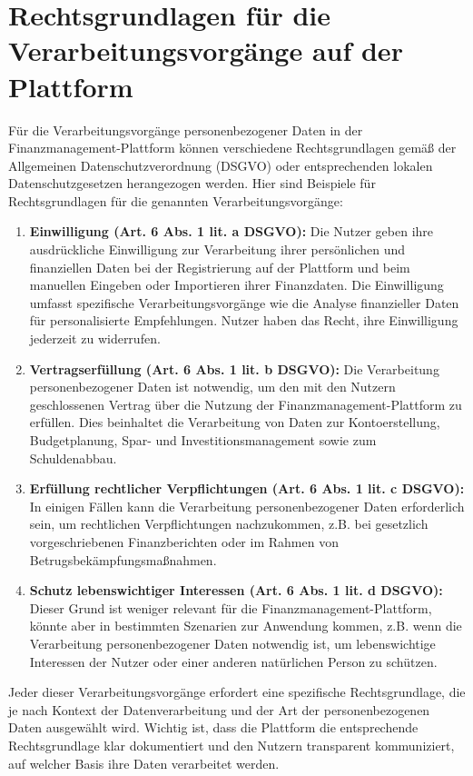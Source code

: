 \chapter{Rechtsgrundlagen für die Verarbeitungsvorgänge auf der Plattform}

Für die Verarbeitungsvorgänge personenbezogener Daten in der Finanzmanagement-Plattform können verschiedene Rechtsgrundlagen gemäß der Allgemeinen Datenschutzverordnung (DSGVO) oder entsprechenden lokalen Datenschutzgesetzen herangezogen werden. Hier sind Beispiele für Rechtsgrundlagen für die genannten Verarbeitungsvorgänge:

\begin{enumerate}
    \item \textbf{Einwilligung (Art. 6 Abs. 1 lit. a DSGVO):}
        Die Nutzer geben ihre ausdrückliche Einwilligung zur Verarbeitung ihrer persönlichen und finanziellen Daten bei der Registrierung auf der Plattform und beim manuellen Eingeben oder Importieren ihrer Finanzdaten. Die Einwilligung umfasst spezifische Verarbeitungsvorgänge wie die Analyse finanzieller Daten für personalisierte Empfehlungen. Nutzer haben das Recht, ihre Einwilligung jederzeit zu widerrufen.

    \item \textbf{Vertragserfüllung (Art. 6 Abs. 1 lit. b DSGVO):}
        Die Verarbeitung personenbezogener Daten ist notwendig, um den mit den Nutzern geschlossenen Vertrag über die Nutzung der Finanzmanagement-Plattform zu erfüllen. Dies beinhaltet die Verarbeitung von Daten zur Kontoerstellung, Budgetplanung, Spar- und Investitionsmanagement sowie zum Schuldenabbau.

    \item \textbf{Erfüllung rechtlicher Verpflichtungen (Art. 6 Abs. 1 lit. c DSGVO):}
        In einigen Fällen kann die Verarbeitung personenbezogener Daten erforderlich sein, um rechtlichen Verpflichtungen nachzukommen, z.B. bei gesetzlich vorgeschriebenen Finanzberichten oder im Rahmen von Betrugsbekämpfungsmaßnahmen.

    \item \textbf{Schutz lebenswichtiger Interessen (Art. 6 Abs. 1 lit. d DSGVO):}
        Dieser Grund ist weniger relevant für die Finanzmanagement-Plattform, könnte aber in bestimmten Szenarien zur Anwendung kommen, z.B. wenn die Verarbeitung personenbezogener Daten notwendig ist, um lebenswichtige Interessen der Nutzer oder einer anderen natürlichen Person zu schützen.
\end{enumerate}


Jeder dieser Verarbeitungsvorgänge erfordert eine spezifische Rechtsgrundlage, die je nach Kontext der Datenverarbeitung und der Art der personenbezogenen Daten ausgewählt wird. Wichtig ist, dass die Plattform die entsprechende Rechtsgrundlage klar dokumentiert und den Nutzern transparent kommuniziert, auf welcher Basis ihre Daten verarbeitet werden.
